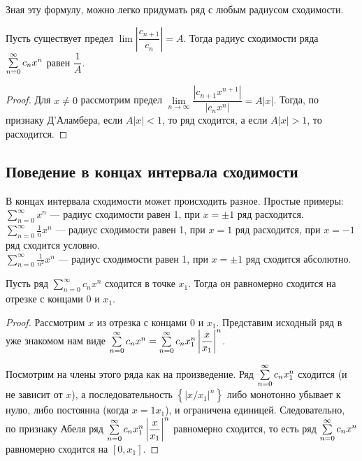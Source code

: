 Зная эту формулу, можно легко придумать ряд с любым радиусом сходимости.

\begin{Statement}
Пусть существует предел $\lim \left|\dfrac{c_{n+1}}{c_n}  \right| = A$. Тогда радиус сходимости ряда $\sum\limits_{n=0}^{\infty} c_nx^n$ равен $\dfrac{1}{A}$.
\end{Statement}

\begin{proof}
Для $x \neq 0$ рассмотрим предел $\lim\limits_{n \to \infty} \dfrac{|c_{n+1}x^{n+1}|}{|c_nx^n|} = A|x|$. Тогда, по признаку Д'Аламбера, если $A|x| < 1$, то ряд сходится, а если $A|x| > 1$, то расходится.
\end{proof}

\subsection{Поведение в концах интервала сходимости}

В концах интервала сходимости может происходить разное.
Простые примеры:
\\$\sum\limits_{n = 0}^{\infty}x^n$ --- радиус сходимости равен 1, при $x= \pm1$ ряд расходится.
\\$\sum\limits_{n = 0}^{\infty}\frac{1}{n} x^n$ --- радиус сходимости равен 1, при $x= 1$ ряд расходится, при $x = -1$ ряд сходится условно.
\\$\sum\limits_{n = 0}^{\infty}\frac{1}{n^2} x^n$ --- радиус сходимости равен 1, при $x= \pm 1$ ряд сходится абсолютно.



\begin{Theorem} [Абеля II]
	Пусть ряд $\sum\limits_{n = 0}^{\infty}c_n x^n$ сходится в точке $x_1$. Тогда он равномерно сходится на отрезке с концами $0$ и $x_1$.
\end{Theorem}

\begin{proof}
Рассмотрим $x$ из отрезка с концами 0 и $x_1$. Представим исходный ряд в уже знакомом нам виде $\sum\limits_{n=0}^{\infty} c_n x^n = \sum\limits_{n=0}^{\infty} c_n x_1^n \left|\dfrac{x}{x_1} \right|^n$.

Посмотрим на члены этого ряда как на произведение. Ряд $\sum\limits_{n=0}^{\infty} c_nx_1^n$ сходится (и не зависит от $x$), а последовательность $\left\{\left|x/x_1\right|^n \right\}$ либо монотонно убывает к нулю, либо постоянна (когда $x=1x_1$), и ограничена единицей. Следовательно, по признаку Абеля ряд $\sum\limits_{n=0}^{\infty} c_n x_1^n \left|\dfrac{x}{x_1} \right|^n$ равномерно сходится, то есть ряд $\sum\limits_{n=0}^{\infty} c_nx^n$ равномерно сходится на $[0, x_1]$.
\end{proof}

